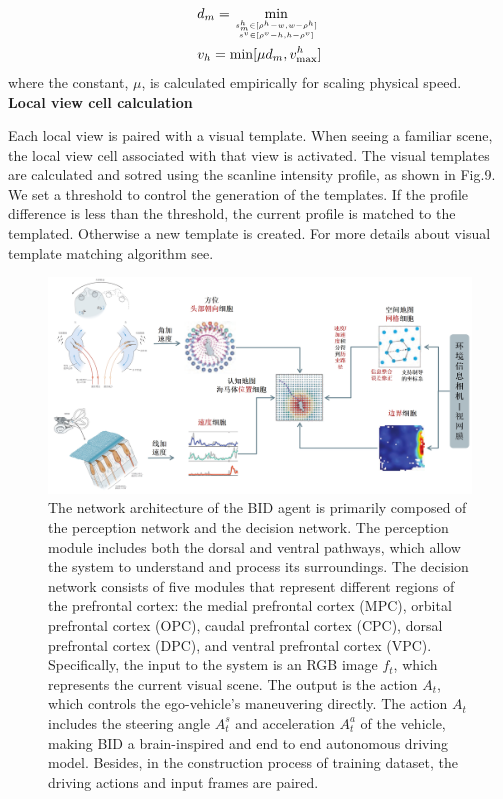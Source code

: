 \begin{equation}
	\begin{aligned}
		& d_m = \min\limits_{s_m^h \in [\rho^h - w, w - \rho^h] \atop s^v \in [ \rho^v - h, h - \rho^v ] } \\
		& v_h = \min [\mu d_m, v_{\max}^h]
	\end{aligned}
\end{equation}
where the constant, $ \mu $, is calculated empirically for scaling physical speed.
\\

\noindent \textbf{Local view cell calculation}

Each local view is paired with a visual template.
When seeing a familiar scene, the local view cell associated with that view is activated.
The visual templates are calculated and sotred using the scanline intensity profile, as shown in Fig.9.
We set a threshold to control the generation of the templates.
If the profile difference is less than the threshold, the current profile is matched to the templated.
Otherwise a new template is created.
For more details about visual template matching algorithm see.




\begin{figure}[t]
	\centering
	\includegraphics[width=\linewidth]{fig/pipeline.png}
	\caption{The network architecture of the BID agent is primarily composed of the perception network and the decision network.
		The perception module includes both the dorsal and ventral pathways, which allow the system to understand and process its surroundings.
		The decision network consists of five modules that represent different regions of the prefrontal cortex: the medial prefrontal cortex (MPC), orbital prefrontal cortex (OPC), caudal prefrontal cortex (CPC), dorsal prefrontal cortex (DPC), and ventral prefrontal cortex (VPC). 
		Specifically, the input to the system is an RGB image $f_{t} $, which represents the current visual scene.
		The output is the action $A_t$, which controls the ego-vehicle's maneuvering directly.
		The action $A_t$ includes the steering angle $ A_t^s $ and acceleration $ A_t^a $ of the vehicle, making BID a brain-inspired and end to end autonomous driving model.
		Besides, in the construction process of training dataset, the driving actions and input frames are paired.
	}
	\label{fig:fig2}
\end{figure}



